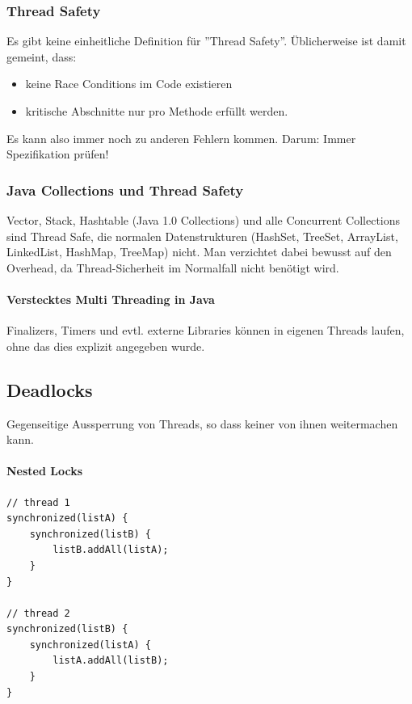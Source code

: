 \subsubsection{Thread Safety}

Es gibt keine einheitliche Definition für ''Thread Safety''. Üblicherweise ist damit gemeint, dass:
\begin{itemize}
    \item keine Race Conditions im Code existieren
    \item kritische Abschnitte nur pro Methode erfüllt werden.
\end{itemize}

Es kann also immer noch zu anderen Fehlern kommen. Darum: Immer Spezifikation prüfen!

\subsubsection{Java Collections und Thread Safety}

Vector, Stack, Hashtable (Java 1.0 Collections) und alle Concurrent Collections sind Thread Safe, die normalen Datenstrukturen (HashSet, TreeSet, ArrayList, LinkedList, HashMap, TreeMap) nicht. Man verzichtet dabei bewusst auf den Overhead, da Thread-Sicherheit im Normalfall nicht benötigt wird.


\paragraph{Verstecktes Multi Threading in Java}
Finalizers, Timers und evtl. externe Libraries können in eigenen Threads laufen, ohne das dies explizit angegeben wurde.

\subsection{Deadlocks}

Gegenseitige Aussperrung von Threads, so dass keiner von ihnen weitermachen kann.

\paragraph{Nested Locks} \hfill
\begin{lstlisting}
// thread 1
synchronized(listA) { 
	synchronized(listB) {
		listB.addAll(listA);
	}
}

// thread 2
synchronized(listB) { 
	synchronized(listA) {
		listA.addAll(listB);
	}
}
\end{lstlisting}


